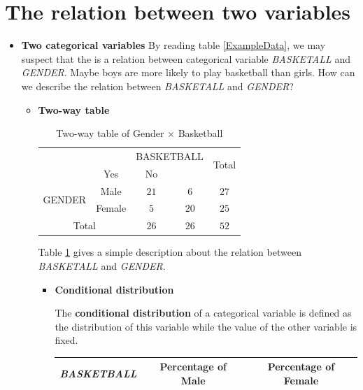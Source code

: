 \documentclass[a4paper, 12pt,twoside]{book}
\begin{document}
\section{The relation between two variables}
\begin{itemize}
\item \textbf{Two categorical variables}
By reading table \ref{ExampleData}, we may suspect that the is a relation between categorical variable \textit{BASKETALL} and \textit{GENDER}. Maybe boys are more likely to play basketball than girls. How can we describe the relation between  \textit{BASKETALL} and \textit{GENDER}?
\begin{itemize}
\item \textbf{Two-way table}
\begin{table}[H]
\begin{center}
 \begin{tabular}{c|cccc}
\hline
\multicolumn{2}{c}{}&\multicolumn{2}{c}{BASKETBALL}&\multirow{2}{*}{Total}\\
\hhline{~~--~}
\multicolumn{2}{c}{}&\multicolumn{1}{c}{Yes}&\multicolumn{1}{c}{No}&\\
\multirow{2}{*}{GENDER}&Male&$21$&$6$&$27$\\
&Female&$5$&$20$&$25$\\
\multicolumn{2}{c}{Total}&$26$&$26$&$52$\\
\hline
 \end{tabular}
\caption{Two-way table of Gender $\times$ Basketball}
\label{Two-way table}
\end{center}
\end{table}
Table \ref{Two-way table} gives a simple description about the relation between \textit{BASKETALL} and \textit{GENDER}.
\begin{itemize}
 \item \textbf{Conditional distribution}
 \vspace{0.6cm}
 
 The \textbf{conditional distribution} of a categorical variable is defined as the distribution of this variable while the value of the other variable is fixed.
 \vspace{0.6cm}
 
 \begin{table}[H]
 \hspace{3cm}
 \begin{tabular}{ccc}
  \vspace{0.2cm}
 \textit{BASKETBALL}&Percentage of Male&Percentage of Female\\
 \hline
 

\end{tabular}
\end{table}
\end{itemize}
\end{itemize}
\end{itemize}
\end{document}
